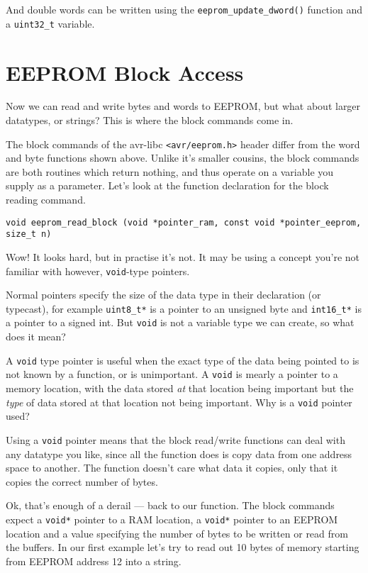 \documentclass[a4paper,oneside,notitlepage]{book}
\begin{document}
And double words can be written using the \lstinline{eeprom_update_dword()} function and a \lstinline{uint32_t} variable.


\chapter{EEPROM Block Access}

Now we can read and write bytes and words to EEPROM, but what about larger datatypes, or strings? This is where the block commands come in.

The block commands of the avr-libc \lstinline{<avr/eeprom.h>} header differ from the word and byte functions shown above. Unlike it's smaller cousins, the block commands are both routines which return nothing, and thus operate on a variable you supply as a parameter. Let's look at the function declaration for the block reading command.

\begin{center}
\begin{lstlisting}
void eeprom_read_block (void *pointer_ram, const void *pointer_eeprom, size_t n)
\end{lstlisting}
\end{center}

Wow! It looks hard, but in practise it's not. It may be using a concept you're not familiar with however, \lstinline{void}-type pointers.

Normal pointers specify the size of the data type in their declaration (or typecast), for example \lstinline{uint8_t*} is a pointer to an unsigned byte and \lstinline{int16_t*} is a pointer to a signed int. But \lstinline{void} is not a variable type we can create, so what does it mean?

A \lstinline{void} type pointer is useful when the exact type of the data being pointed to is not known by a function, or is unimportant. A \lstinline{void} is mearly a pointer to a memory location, with the data stored \textit{at} that location being important but the \textit{type} of data stored at that location not being important. Why is a \lstinline{void} pointer used?

Using a \lstinline{void} pointer means that the block read/write functions can deal with any datatype you like, since all the function does is copy data from one address space to another. The function doesn't care what data it copies, only that it copies the correct number of bytes.

Ok, that's enough of a derail --- back to our function. The block commands expect a \lstinline{void*} pointer to a RAM location, a \lstinline{void*} pointer to an EEPROM location and a value specifying the number of bytes to be written or read from the buffers. In our first example let's try to read out 10 bytes of memory starting from EEPROM address 12 into a string.
\end{document}

